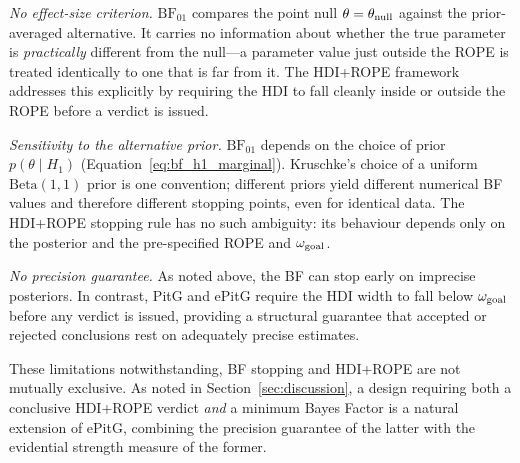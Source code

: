 \textit{No effect-size criterion.}  $\mathrm{BF}_{01}$ compares the point null
$\theta = \theta_{\rm null}$ against the prior-averaged alternative.  It carries no
information about whether the true parameter is \emph{practically} different from the
null---a parameter value just outside the ROPE is treated identically to one that is
far from it.  The HDI+ROPE framework addresses this explicitly by requiring the HDI to
fall cleanly inside or outside the ROPE before a verdict is issued.

\textit{Sensitivity to the alternative prior.}  $\mathrm{BF}_{01}$ depends on the
choice of prior $p(\theta \mid H_1)$ (Equation~\ref{eq:bf_h1_marginal}).  Kruschke's
choice of a uniform $\mathrm{Beta}(1,1)$ prior is one convention; different priors
yield different numerical BF values and therefore different stopping points, even
for identical data.  The HDI+ROPE stopping rule has no such ambiguity: its behaviour
depends only on the posterior and the pre-specified ROPE and $\omega_{\rm goal}$.

\textit{No precision guarantee.}  As noted above, the BF can stop early on imprecise
posteriors.  In contrast, PitG and ePitG require the HDI width to fall below
$\omega_{\rm goal}$ before any verdict is issued, providing a structural guarantee
that accepted or rejected conclusions rest on adequately precise estimates.

These limitations notwithstanding, BF stopping and HDI+ROPE are not mutually exclusive.
As noted in Section~\ref{sec:discussion}, a design requiring both a conclusive
HDI+ROPE verdict \textit{and} a minimum Bayes Factor is a natural extension of ePitG,
combining the precision guarantee of the latter with the evidential strength measure
of the former.